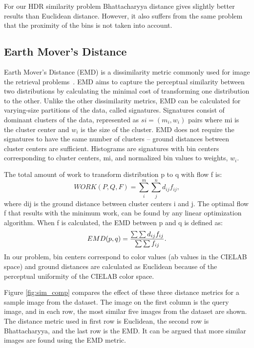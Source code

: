 For our HDR similarity problem Bhattacharyya distance gives slightly better results than Euclidean distance. However, it also suffers from the same problem that the proximity of the bins is not taken into account.
\subsection{Earth Mover’s Distance}
Earth Mover’s Distance (EMD) is a dissimilarity metric commonly used for image the retrieval problems~\cite{rubner2000earth}. EMD aims to capture the perceptual similarity between two distributions by calculating the minimal cost of transforming one distribution to the other. Unlike the other dissimilarity metrics, EMD can be calculated for varying-size partitions of the data, called signatures.
Signatures consist of dominant clusters of the data, represented as $si = (m_i, w_i)$ pairs where mi is the cluster center and $w_i$ is the size of the cluster. EMD does not require the signatures to have the same number of clusters – ground distances between cluster centers are sufficient. Histograms are signatures with bin centers corresponding to cluster centers, mi, and normalized bin values to weights, $w_i$.

The total amount of work to transform distribution
p to q with flow f is:
\begin{equation}
WORK(P,Q,F) = \sum_i^m \sum_j^n d_{ij}f_{ij}, 
\end{equation}
where dij is the ground distance between cluster centers i and j. The optimal flow f that results with the minimum work, can be found by any linear optimization algorithm. When f is calculated, the EMD between p and q is defined as:
\begin{equation}
EMD(p,q) = {{\sum \sum d_{ij}f_{ij}}\over{\sum \sum f_{ij}}}.
\end{equation}
In our problem, bin centers correspond to color values (ab values in the CIELAB space) and ground distances are calculated as Euclidean because of the perceptual uniformity of the CIELAB color space.

Figure \ref{fig:sim_comp} compares the effect of these three distance metrics for a sample image from the dataset. The image on the first column is the query image, and in each row, the most similar five images from the dataset are shown. The distance metric used in first row is Euclidean, the second row is Bhattacharyya, and the last row is the EMD. It can be argued that more similar images are found using the EMD metric.

